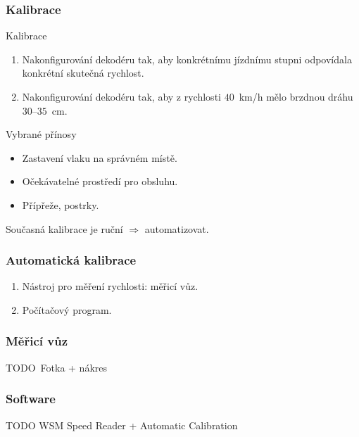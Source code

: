 \documentclass[aspectratio=169]{beamer}
\begin{document}

\begin{frame}
\frametitle{Kalibrace}
\begin{block}{Kalibrace}
\begin{enumerate}
\item Nakonfigurování dekodéru tak, aby konkrétnímu jízdnímu stupni odpovídala
konkrétní skutečná rychlost.
\item Nakonfigurování dekodéru tak, aby z rychlosti $40$~km/h mělo brzdnou dráhu
$30$--$35$~cm.
\end{enumerate}
\end{block}

\pause

\begin{block}{Vybrané přínosy}
\begin{itemize}
\item Zastavení vlaku na správném místě.
\item Očekávatelné prostředí pro obsluhu.
\item Přípřeže, postrky.
\end{itemize}
\end{block}

Současná kalibrace je ruční $\Rightarrow$ automatizovat.
\end{frame}


\begin{frame}
\frametitle{Automatická kalibrace}
\begin{enumerate}
\item Nástroj pro měření rychlosti: měřicí vůz.
\item Počítačový program.
\end{enumerate}
\end{frame}


\begin{frame}
\frametitle{Měřicí vůz}
TODO Fotka + nákres
\end{frame}


\begin{frame}
\frametitle{Software}
TODO WSM Speed Reader + Automatic Calibration
\end{frame}

\end{document}

